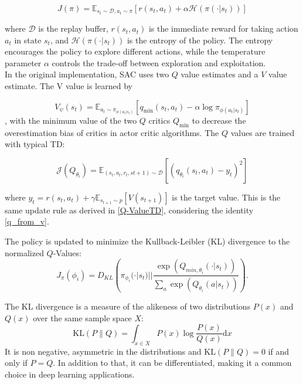 \begin{equation}
J(\pi) = \mathbb{E}_{s_t \sim \mathcal{D}, a_t \sim \pi}[r(s_t, a_t) + \alpha \mathcal{H}(\pi(\cdot|s_t))]
\end{equation}

where $\mathcal{D}$ is the replay buffer, $r(s_t, a_t)$ is the immediate reward for taking action $a_t$ in state $s_t$, and $\mathcal{H}(\pi(\cdot|s_t))$ is the entropy of the policy. The entropy 
encourages the policy to explore different actions, while the temperature parameter $\alpha$ controls the trade-off between exploration and exploitation.\\

In the original implementation, SAC uses two $Q$ value estimates and a $V$ value estimate. The V value is learned by 

\begin{equation}
    V_{\psi}(s_t) = \mathbb{E}_{a_t \sim \pi_{\phi(a_t|s_t)}}[q_\text{min}(s_t, a_t) - \alpha \log \pi_{\phi(a_t|s_t)}]
\end{equation}
, with the minimum value of the two $Q$ critics $Q_\text{min}$ to decrease the overestimation bias of critics in actor critic algorithms. 
The $Q$ values are trained with typical TD:

\begin{equation}
    \mathcal{J}(Q_{\theta_i}) = \mathbb{E}_{(s_t, a_t, r_t, s{t+1}) \sim \mathcal{D}}[(q_{\theta_i}(s_t,a_t) - y_t)^2]
\end{equation}

where $y_t = r(s_t, a_t) + \gamma \mathbb{E}_{s_{t+1} \sim p}[V(s_{t+1})]$ is the target value. This is the same update rule as derived in \ref{Q-ValueTD}, 
considering the identity \ref{q_from_v}.

The policy is updated to minimize the Kullback-Leibler (KL) divergence to the normalized $Q$-Values:
\begin{equation}
    \label{sac_pol_obj}
    J_\pi(\phi_{i}) = D_{KL} \left( \pi_{\phi_{i}}(\cdot|s_t) || \frac{\exp(Q_{min, {\theta_i}}(\cdot|s_t))}{\underset{a}{\sum}  \exp(Q_{\theta_i}(a|s_t))} \right).
\end{equation}

The KL divergence is a measure of the alikeness of two distributions $P(x)$ and $Q(x)$ over the same sample space $X$:
\begin{equation}
    \label{KL}
    \mathrm{KL}(P\|Q) = \int_{x\in X} P(x) \log \frac{P(x)}{Q(x)} \mathrm{d}x
\end{equation}
It is non negative, asymmetric in the distributions and $\mathrm{KL}(P\|Q) = 0$ if and only if $P = Q$. In addition to that, it can be differentiated, making it 
a common choice in deep learning applications.\\

